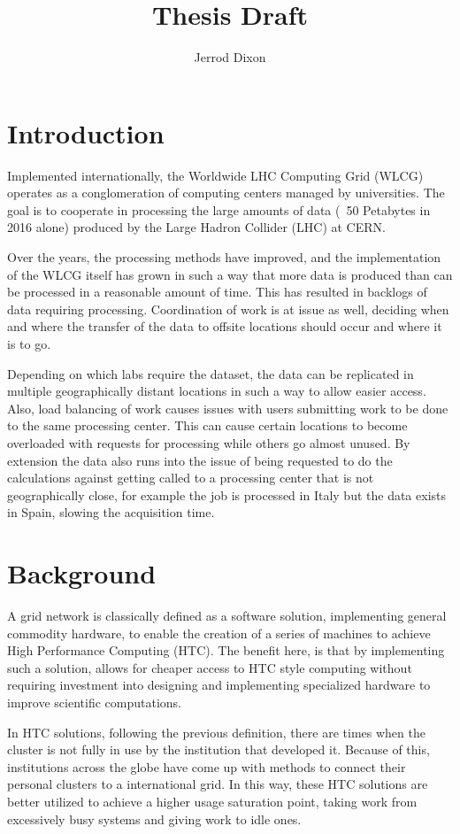 \documentclass[]{scrartcl}
\title{Thesis Draft}
\author{Jerrod Dixon}
\begin{document}
\maketitle

\section{Introduction}
Implemented internationally, the Worldwide LHC Computing Grid (WLCG) operates as a conglomeration of computing centers managed by universities. The goal is to cooperate in processing the large amounts of data (~50 Petabytes in 2016 alone) produced by the Large Hadron Collider (LHC) at CERN.

Over the years, the processing methods have improved, and the implementation of the WLCG itself has grown in such a way that more data is produced than can be processed in a reasonable amount of time. This has resulted in backlogs of data requiring processing. Coordination of work is at issue as well, deciding when and where the transfer of the data to offsite locations should occur and where it is to go. 

Depending on which labs require the dataset, the data can be replicated in multiple geographically distant locations in such a way to allow easier access. Also, load balancing of work causes issues with users submitting work to be done to the same processing center. This can cause certain locations to become overloaded with requests for processing while others go almost unused. By extension the data also runs into the issue of being requested to do the calculations against getting called to a processing center that is not geographically close, for example the job is processed in Italy but the data exists in Spain, slowing the acquisition time. 

\section{Background}
A grid network is classically defined as a software solution, implementing general commodity hardware, to enable the creation of a series of machines to achieve High Performance Computing (HTC). The benefit here, is that by implementing such a solution, allows for cheaper access to HTC style computing without requiring investment into designing and implementing specialized hardware to improve scientific computations.

In HTC solutions, following the previous definition, there are times when the cluster is not fully in use by the institution that developed it. Because of this, institutions across the globe have come up with methods to connect their personal clusters to a international grid. In this way, these HTC solutions are better utilized to achieve a higher usage saturation point, taking work from excessively busy systems and giving work to idle ones.
\end{document}
